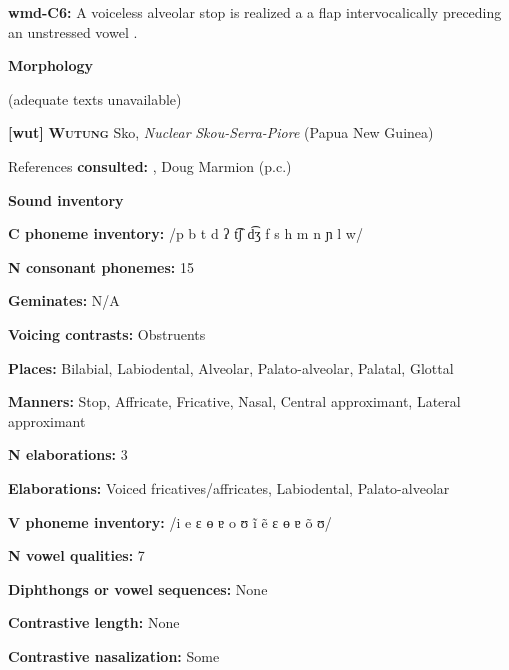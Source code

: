 \textbf{wmd-C6:} A voiceless alveolar stop is realized a a flap intervocalically preceding an unstressed vowel \citep[55]{Eberhard2009}.



\textbf{Morphology}



(adequate texts unavailable)



\textbf{[wut]}   \textbf{\textsc{Wutung}}  Sko, \textit{Nuclear} \textit{Skou-Serra-Piore} (Papua New Guinea)



References \textbf{consulted:} \citet{Marmion2010}, Doug Marmion (p.c.)



\textbf{Sound inventory}



\textbf{C phoneme inventory:} /p b t d ʔ t͡ʃ d͡ʒ f s h m n ɲ l w/



\textbf{N consonant phonemes:} 15



\textbf{Geminates:} N/A



\textbf{Voicing contrasts:} Obstruents



\textbf{Places:} Bilabial, Labiodental, Alveolar, Palato-alveolar, Palatal, Glottal



\textbf{Manners:} Stop, Affricate, Fricative, Nasal, Central approximant, Lateral approximant



\textbf{N elaborations:} 3



\textbf{Elaborations:} Voiced fricatives/affricates, Labiodental, Palato-alveolar



\textbf{V phoneme inventory:} /i e ɛ ɵ ɐ o ʊ ĩ ẽ ɛ ɵ ɐ õ ʊ/



\textbf{N vowel qualities:} 7



\textbf{Diphthongs or vowel sequences:} None



\textbf{Contrastive length:} None



\textbf{Contrastive nasalization:} Some



